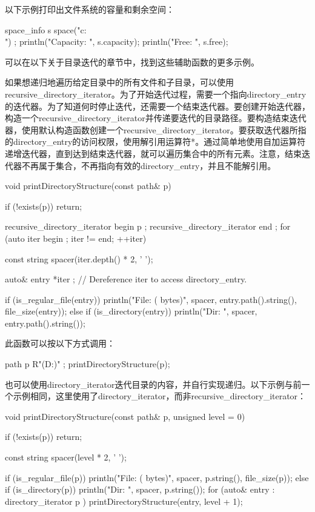 以下示例打印出文件系统的容量和剩余空间：

\begin{cpp}
space_info s { space("c:\\") };
println("Capacity: {}", s.capacity);
println("Free: {}", s.free);
\end{cpp}

可以在以下关于目录迭代的章节中，找到这些辅助函数的更多示例。


如果想递归地遍历给定目录中的所有文件和子目录，可以使用recursive\_directory\_iterator。为了开始迭代过程，需要一个指向directory\_entry的迭代器。为了知道何时停止迭代，还需要一个结束迭代器。要创建开始迭代器，构造一个recursive\_directory\_iterator并传递要迭代的目录路径。要构造结束迭代器，使用默认构造函数创建一个recursive\_directory\_iterator。要获取迭代器所指的directory\_entry的访问权限，使用解引用运算符*。通过简单地使用自加运算符递增迭代器，直到达到结束迭代器，就可以遍历集合中的所有元素。注意，结束迭代器不再属于集合，不再指向有效的directory\_entry，并且不能解引用。

\begin{cpp}
void printDirectoryStructure(const path& p)
{
    if (!exists(p)) { return; }

    recursive_directory_iterator begin { p };
    recursive_directory_iterator end { };
    for (auto iter { begin }; iter != end; ++iter) {

        const string spacer(iter.depth() * 2, ' ');

        auto& entry { *iter }; // Dereference iter to access directory_entry.

        if (is_regular_file(entry)) {
            println("{}File: {} ({} bytes)",
            spacer, entry.path().string(), file_size(entry));
        } else if (is_directory(entry)) {
            println("{}Dir: {}", spacer, entry.path().string());
        }
    }
}
\end{cpp}

此函数可以按以下方式调用：

\begin{cpp}
path p { R"(D:\Foo\Bar)" };
printDirectoryStructure(p);
\end{cpp}

也可以使用directory\_iterator迭代目录的内容，并自行实现递归。以下示例与前一个示例相同，这里使用了directory\_iterator，而非recursive\_directory\_iterator：

\begin{cpp}
void printDirectoryStructure(const path& p, unsigned level = 0)
{
    if (!exists(p)) { return; }

    const string spacer(level * 2, ' ');

    if (is_regular_file(p)) {
        println("{}File: {} ({} bytes)", spacer, p.string(), file_size(p));
    } else if (is_directory(p)) {
        println("{}Dir: {}", spacer, p.string());
        for (auto& entry : directory_iterator { p }) {
            printDirectoryStructure(entry, level + 1);
        }
    }
}
\end{cpp}









